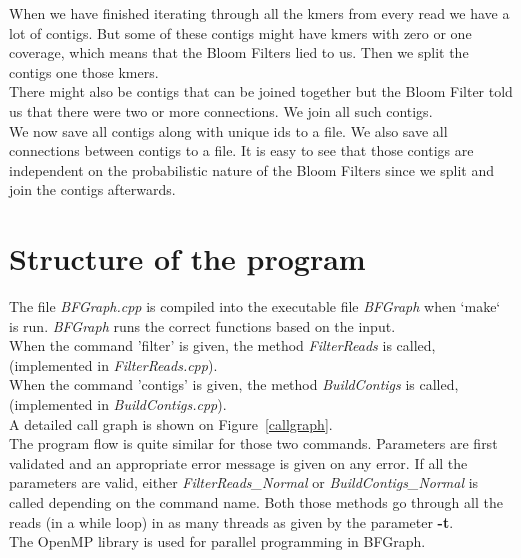 \documentclass[a4paper]{report}
\renewcommand{\b}[1]{\textbf{#1}}  %
\renewcommand{\i}[1]{\textit{#1}}  %
\newcommand{\e}[1]{\emph{#1}}    %
\begin{document}
When we have finished iterating through all the kmers from every read we have a lot of contigs. But some of these contigs might have 
kmers with zero or one coverage, which means that the Bloom Filters lied to us. Then we split the contigs one those kmers.\\[4pt]

There might also be contigs that can be joined together but the Bloom Filter told us that there were two or more connections. We join all
such contigs.\\[4pt]

We now save all contigs along with unique ids to a file. We also save all connections between contigs to a file. It is easy to see
that those contigs are independent on the probabilistic nature of the Bloom Filters since we split and join the contigs afterwards.\\[4pt]


\chapter{Structure of the program}
The file \e{BFGraph.cpp} is compiled into the executable file \e{BFGraph} when `make` is run. 
\e{BFGraph} runs the correct functions based on the input.\\[4pt]
When the command 'filter' is given, the method \i{FilterReads} is called, (implemented in \e{FilterReads.cpp}).\\
When the command 'contigs' is given, the method \i{BuildContigs} is called, (implemented in \e{BuildContigs.cpp}).\\
A detailed call graph is shown on Figure~\ref{callgraph}.\\[4pt]

The program flow is quite similar for those two commands. Parameters are first validated and an appropriate error message is given
on any error. If all the parameters are valid, either \i{FilterReads\_Normal} or \i{BuildContigs\_Normal} is called depending
on the command name. Both those methods go through all the reads (in a while loop) in as many threads as given by the parameter \b{-t}.\\[4pt]

The OpenMP\cite{openmp} library is used for parallel programming in BFGraph.\\[4pt]
\end{document}
